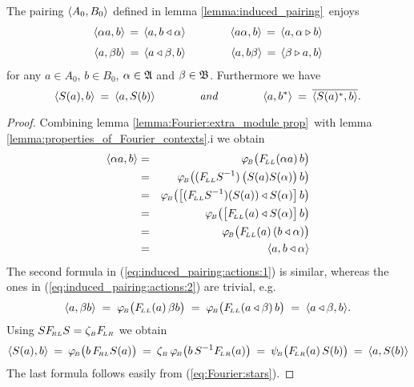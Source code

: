 \begin{lemma_sec}
The pairing\/ $\pair{A_0}{B_0}$ defined in lemma \ref{lemma:induced_pairing}\ enjoys
\begin{eqnarray}
   \pair{\alpha a}{b} \,=\, \pair{a}{b \ract \alpha} & \hspace{3em} &
   \pair{a \alpha}{b} \,=\, \pair{a}{\alpha \lact b}
\label{eq:induced_pairing:actions:1} \\ \vertL
   \pair{a}{\beta b}  \,=\, \pair{a \ract \beta}{b}  & &
   \pair{a}{b \beta}  \,=\, \pair{\beta \lact a}{b}
\label{eq:induced_pairing:actions:2}
\end{eqnarray}
for any\/ $a \in A_0$, $b \in B_0$, $\alpha \in {\frakA}$ and\/ $\beta\in {\frakB}$.
Furthermore we have
$$   \pair{S(a)}{b} \:=\: \pair{a}{S(b)}
           \itandspace{4em}
     \pair{a}{b^*} \:=\: \overline{\pair{S(a)^*}{b}}.  $$
\end{lemma_sec}
\begin{proof}
Combining lemma \ref{lemma:Fourier:extra_module prop}\
with lemma \ref{lemma:properties_of_Fourier_contexts}.i we obtain
\begin{eqnarray*}
\pair{\alpha a}{b}
&=&
\phiB\!\left(\FLL(\alpha a)\, b \vertM\right) \\
&=&
\phiB\!\left((\FLL S^{-1})\left(S(a) S(\alpha)\vertM\right) b \right) \\
&=&
\phiB\!\left(\left[(\FLL S^{-1})(S(a)) \ract S(\alpha) \vertM\right] b \right)   \\
&=&
\phiB\!\left(\left[\FLL(a) \ract S(\alpha) \vertM\right] b\right)  \\
&=&
\phiB\!\left(\FLL(a)\, (b \ract \alpha) \vertM\right) \\
&=&
\pair{a}{b \ract \alpha}
\end{eqnarray*}
The second formula in (\ref{eq:induced_pairing:actions:1}) is similar,
whereas the ones in (\ref{eq:induced_pairing:actions:2}) are trivial, e.g.
$$ \pair{a}{\beta b}
   \;=\; \phiB\!\left(\FLL(a)\, \beta b \vertM\right)
   \;=\; \phiB\!\left(\FLL(a \ract \beta) \, b \vertM\right)
   \;=\; \pair{a \ract \beta}{b}.   $$
Using $S \FRL S = \zetaB \FLR$ we obtain
$$ \pair{S(a)}{b}
    \:=\: \phiB\!\left(b \,\FRL S(a) \vertM\right)
    \:=\: \zetaB \, \phiB\!\left(b \,S^{-1} \FLR(a) \vertM\right)
    \:=\: \psiB\!\left(\FLR(a) \, S(b) \vertM\right)
    \:=\: \pair{a}{S(b)} $$
The last formula follows easily from (\ref{eq:Fourier:stars}).
\end{proof}



